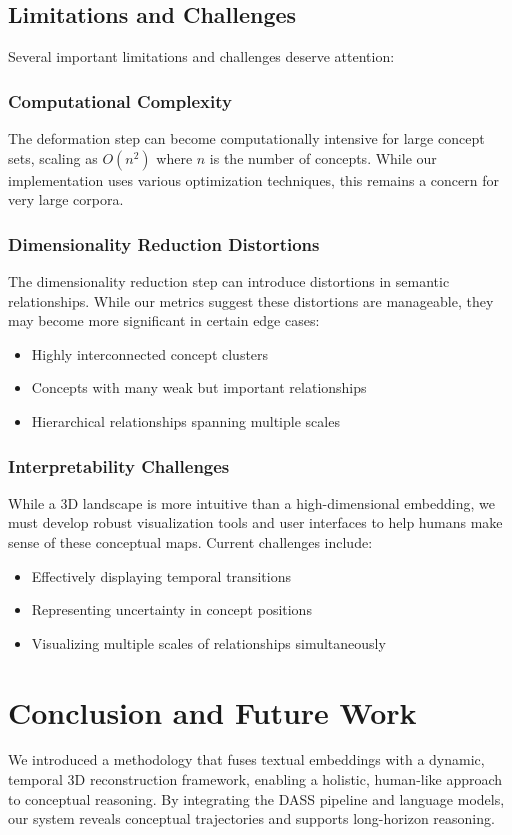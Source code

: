 \documentclass{article}
\begin{document}
\subsection{Limitations and Challenges}
Several important limitations and challenges deserve attention:

\subsubsection{Computational Complexity}
The deformation step can become computationally intensive for large concept sets, scaling as $O(n^2)$ where $n$ is the number of concepts. While our implementation uses various optimization techniques, this remains a concern for very large corpora.

\subsubsection{Dimensionality Reduction Distortions}
The dimensionality reduction step can introduce distortions in semantic relationships. While our metrics suggest these distortions are manageable, they may become more significant in certain edge cases:
\begin{itemize}
    \item Highly interconnected concept clusters
    \item Concepts with many weak but important relationships
    \item Hierarchical relationships spanning multiple scales
\end{itemize}

\subsubsection{Interpretability Challenges}
While a 3D landscape is more intuitive than a high-dimensional embedding, we must develop robust visualization tools and user interfaces to help humans make sense of these conceptual maps. Current challenges include:
\begin{itemize}
    \item Effectively displaying temporal transitions
    \item Representing uncertainty in concept positions
    \item Visualizing multiple scales of relationships simultaneously
\end{itemize}

\section{Conclusion and Future Work}
We introduced a methodology that fuses textual embeddings with a dynamic, temporal 3D reconstruction framework, enabling a holistic, human-like approach to conceptual reasoning. By integrating the DASS pipeline and language models, our system reveals conceptual trajectories and supports long-horizon reasoning.
\end{document}
